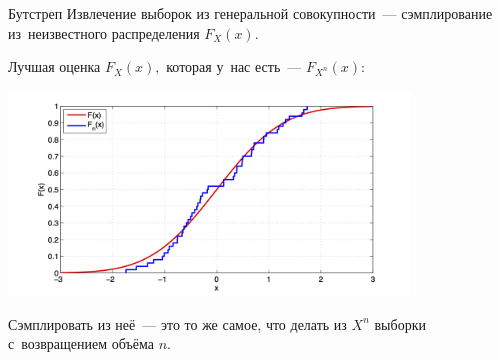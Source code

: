 \documentclass[9pt,pdf,utf8,hyperref={unicode},aspectratio=169]{beamer}
\begin{document}
\begin{frame}{Бутстреп}
	Извлечение выборок из генеральной совокупности~--- сэмплирование из~неизвестного распределения $F_X\left(x\right).$	
	
	Лучшая оценка $F_X\left(x\right),$ которая у~нас есть~--- $F_{X^n}\left(x\right)$:
	\begin{center}
		\includegraphics[width=0.8\textwidth]{ecdf.png}
	\end{center}
	Сэмплировать из неё~--- это то же самое, что делать из $X^n$ выборки с~возвращением объёма $n$. 		
\end{frame}
\end{document}
